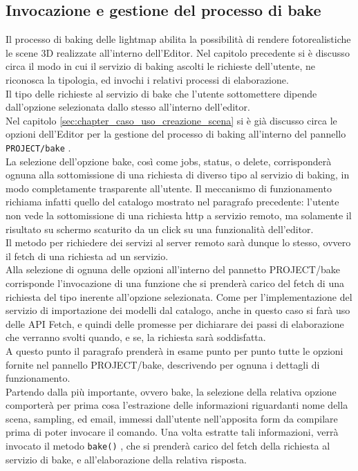 \subsection{Invocazione e gestione del processo di bake}
\label{sec:chapter_creazione_scena_funzionalita_editor_bake}
Il processo di baking delle lightmap abilita la possibilità di rendere fotorealistiche le scene 3D realizzate all’interno dell’Editor. Nel capitolo precedente si è discusso circa il modo in cui il servizio di baking ascolti le richieste dell’utente, ne riconosca la tipologia, ed invochi i relativi processi di elaborazione.
\\ 
Il tipo delle richieste al servizio di bake che l’utente sottomettere dipende dall’opzione selezionata dallo stesso all’interno dell’editor.
\\ 
Nel capitolo \ref{sec:chapter_caso_uso_creazione_scena} si è già discusso circa le opzioni dell’Editor per la gestione del processo di baking all’interno del pannello \texttt{PROJECT/bake} .
\\
La selezione dell’opzione bake, così come jobs, status, o delete, corrisponderà ognuna alla sottomissione di una richiesta di diverso tipo al servizio di baking, in modo completamente trasparente all’utente. Il meccanismo di funzionamento richiama infatti quello del catalogo mostrato nel paragrafo precedente: l’utente non vede la sottomissione di una richiesta http a servizio remoto, ma solamente il risultato su schermo scaturito da un click su una funzionalità dell'editor.
\\
Il metodo per richiedere dei servizi al server remoto sarà dunque lo stesso, ovvero il fetch di una richiesta ad un servizio.
\\ 
Alla selezione di ognuna delle opzioni all’interno del pannetto PROJECT/bake corrisponde l’invocazione di una funzione che si prenderà carico del fetch di una richiesta del tipo inerente all’opzione selezionata. Come per l’implementazione del servizio di importazione dei modelli dal catalogo, anche in questo caso si farà uso delle API Fetch, e quindi delle promesse per dichiarare dei passi di elaborazione che verranno svolti quando, e se, la richiesta sarà soddisfatta.
\\ 
A questo punto il paragrafo prenderà in esame punto per punto tutte le opzioni fornite nel pannello PROJECT/bake, descrivendo per ognuna i dettagli di funzionamento.
\\
Partendo dalla più importante, ovvero bake, la selezione della relativa opzione comporterà per prima cosa l’estrazione delle informazioni riguardanti nome della scena, sampling, ed email, immessi dall’utente nell’apposita form da compilare prima di poter invocare il comando. Una volta estratte tali informazioni, verrà invocato il metodo \texttt{bake()} , che si prenderà carico del fetch della richiesta al servizio di bake, e all’elaborazione della relativa risposta.
